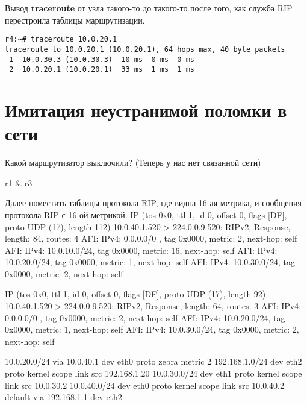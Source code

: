 \documentclass[a4paper,12pt]{article}
\begin{document}
Вывод \textbf{traceroute} от узла такого-то до такого-то после того, как служба RIP перестроила таблицы маршрутизации.

\begin{Verbatim}
r4:~# traceroute 10.0.20.1
traceroute to 10.0.20.1 (10.0.20.1), 64 hops max, 40 byte packets
 1  10.0.30.3 (10.0.30.3)  10 ms  0 ms  0 ms
 2  10.0.20.1 (10.0.20.1)  33 ms  1 ms  1 ms
\end{Verbatim}

\section{Имитация неустранимой поломки в сети}

Какой маршрутизатор выключили? (Теперь у нас нет связанной сети)

r1 & r3

Далее поместить таблицы протокола RIP, где видна 16-ая метрика, и сообщения протокола RIP с 16-ой метрикой.
IP (tos 0x0, ttl 1, id 0, offset 0, flags [DF], proto UDP (17), length 112) 10.0.40.1.520 > 224.0.0.9.520: 
	RIPv2, Response, length: 84, routes: 4
	  AFI: IPv4:         0.0.0.0/0 , tag 0x0000, metric: 2, next-hop: self
	  AFI: IPv4:       10.0.10.0/24, tag 0x0000, metric: 16, next-hop: self
	  AFI: IPv4:       10.0.20.0/24, tag 0x0000, metric: 1, next-hop: self
	  AFI: IPv4:       10.0.30.0/24, tag 0x0000, metric: 2, next-hop: self

IP (tos 0x0, ttl 1, id 0, offset 0, flags [DF], proto UDP (17), length 92) 10.0.40.1.520 > 224.0.0.9.520: 
	RIPv2, Response, length: 64, routes: 3
	  AFI: IPv4:         0.0.0.0/0 , tag 0x0000, metric: 2, next-hop: self
	  AFI: IPv4:       10.0.20.0/24, tag 0x0000, metric: 1, next-hop: self
	  AFI: IPv4:       10.0.30.0/24, tag 0x0000, metric: 2, next-hop: self

10.0.20.0/24 via 10.0.40.1 dev eth0  proto zebra  metric 2 
192.168.1.0/24 dev eth2  proto kernel  scope link  src 192.168.1.20 
10.0.30.0/24 dev eth1  proto kernel  scope link  src 10.0.30.2 
10.0.40.0/24 dev eth0  proto kernel  scope link  src 10.0.40.2 
default via 192.168.1.1 dev eth2 
\end{document}
